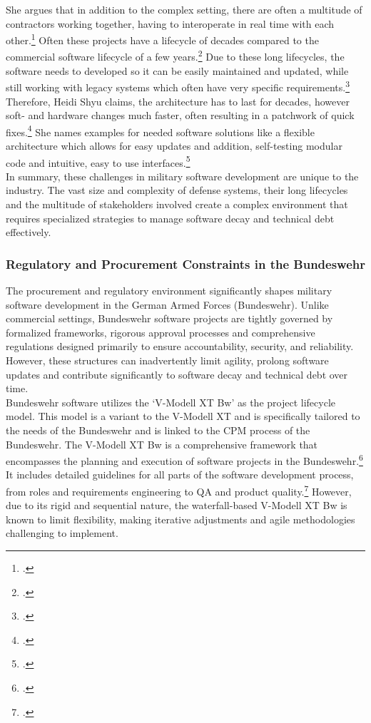 She argues that in addition to the complex setting, there are often a multitude of contractors working together, having to interoperate in real time with each other.\footcite[11]{shyu2017military}
Often these projects have a lifecycle of decades compared to the commercial software lifecycle of a few years.\footcite[14]{shyu2017military}
Due to these long lifecycles, the software needs to developed so it can be easily maintained and updated, while still working with legacy systems
which often have very specific requirements.\footcite[14]{shyu2017military}
Therefore, Heidi Shyu claims, the architecture has to last for decades, however soft- and hardware changes much faster, often resulting in a patchwork of quick fixes.\footcite[15]{shyu2017military}
She names examples for needed software solutions like a flexible architecture which allows for easy updates and addition, self-testing modular code and intuitive, easy to use interfaces.\footcite[17]{shyu2017military}\\

In summary, these challenges in military software development are unique to the industry. The vast size and complexity of defense systems,
their long lifecycles and the multitude of stakeholders involved create a complex environment that requires specialized strategies to manage software decay and technical debt effectively.

\subsubsection{Regulatory and Procurement Constraints in the Bundeswehr}
The procurement and regulatory environment significantly shapes military software development in the German Armed Forces (Bundeswehr). Unlike commercial settings,
Bundeswehr software projects are tightly governed by formalized frameworks, rigorous approval processes and comprehensive regulations designed primarily to ensure 
accountability, security, and reliability. However, these structures can inadvertently limit agility, prolong software updates and contribute significantly to software decay
and technical debt over time.\\

Bundeswehr software utilizes the `V-Modell XT Bw' as the project lifecycle model. This model is a variant to the V-Modell XT and 
is specifically tailored to the needs of the Bundeswehr and is linked to the \ac{CPM} process of the Bundeswehr.
The V-Modell XT Bw is a comprehensive framework that encompasses the planning and execution of software projects in the Bundeswehr.\footcite[6]{bundeswehrVModellXTBw}
It includes detailed guidelines for all parts of the software development process, from roles and requirements engineering to \ac{QA} and product quality.\footcite[pp. 20-21]{bundeswehrVModellXTBw}
However, due to its rigid and sequential nature, the waterfall-based V-Modell XT Bw is known to limit flexibility, making iterative adjustments and agile methodologies challenging to implement.\\

